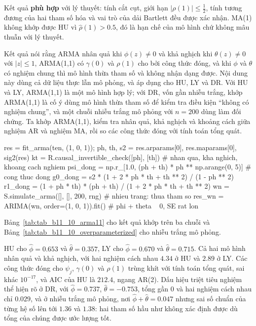  Kết quả \textbf{phù hợp} với lý thuyết: tính cắt cụt, giới hạn $|\rho(1)|\le\tfrac12$, tính tương đương của hai tham số hóa và vai trò của dải Bartlett đều được xác nhận. MA(1) không khớp được HU vì $\hat\rho(1)>0.5$, đó là hạn chế của mô hình chứ không mâu thuẫn với lý thuyết.

 Kết quả  nói rằng ARMA nhân quả khi $\phi(z)\ne0$ và khả nghịch khi $\theta(z)\ne0$ với $|z|\le1$, ARMA(1,1) có $\gamma(0)$ và $\rho(1)$ cho bởi công thức đóng, và khi $\phi$ và $\theta$ có nghiệm chung thì mô hình thừa tham số và không nhận dạng được.
 Nội dung này dùng cả dữ liệu thực lẫn mô phỏng, và áp dụng cho HU, LY và DR. Với HU và LY, ARMA(1,1) là một mô hình hợp lý; với DR, vốn gần nhiễu trắng, khớp ARMA(1,1) là cố ý dùng mô hình thừa tham số để kiểm tra điều kiện ``không có nghiệm chung'', và một chuỗi nhiễu trắng mô phỏng với $n=200$ dùng làm đối chứng. Ta khớp ARMA(1,1), kiểm tra nhân quả, khả nghịch và khoảng cách giữa nghiệm AR và nghiệm MA, rồi so các công thức đóng với tính toán tổng quát.
\begin{codeblock}
res = fit_arma(ten, (1, 0, 1)); ph, th, s2 = res.arparams[0], res.maparams[0], sig2(res)
kt = R.causal_invertible_check([ph], [th])   # nhan qua, kha nghich, khoang cach nghiem
psi_dong = np.r_[1.0, (ph + th) * ph ** np.arange(0, 5)]       # cong thuc dong
g0_dong = s2 * (1 + 2 * ph * th + th ** 2) / (1 - ph ** 2)
r1_dong = (1 + ph * th) * (ph + th) / (1 + 2 * ph * th + th ** 2)
wn = S.simulate_arma([], [], 200, rng)                          # nhieu trang: thua tham so
res_wn = ARIMA(wn, order=(1, 0, 1)).fit()                       # phi + theta ~ 0, SE rat lon
\end{codeblock}
 Bảng~\ref{tab:tab_b11_10_arma11} cho kết quả khớp trên ba chuỗi và Bảng~\ref{tab:tab_b11_10_overparameterized} cho nhiễu trắng mô phỏng.


 HU cho $\hat\phi=0.653$ và $\hat\theta=0.357$, LY cho $\hat\phi=0.670$ và $\hat\theta=0.715$. Cả hai mô hình nhân quả và khả nghịch, với hai nghiệm cách nhau $4.34$ ở HU và $2.89$ ở LY. Các công thức đóng cho $\psi_j$, $\gamma(0)$ và $\rho(1)$ trùng khít với tính toán tổng quát, sai khác $10^{-17}$, và AIC của HU là $212.4$, ngang AR(2). Dấu hiệu triệt tiêu nghiệm thể hiện rõ ở DR, với $\hat\phi=0.737$, $\hat\theta=-0.753$, tổng gần $0$ và hai nghiệm cách nhau chỉ $0.029$, và ở nhiễu trắng mô phỏng, nơi $\hat\phi+\hat\theta=0.047$ nhưng sai số chuẩn của từng hệ số lên tới $1.36$ và $1.38$: hai tham số hầu như không xác định được dù tổng của chúng được ước lượng tốt.

